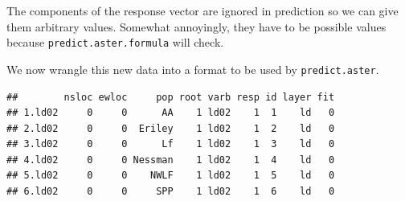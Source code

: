 \documentclass[
  ignorenonframetext,
]{beamer}
\newenvironment{Shaded}{\begin{snugshade}}{\end{snugshade}}
\newcommand{\AttributeTok}[1]{\textcolor[rgb]{0.13,0.29,0.53}{#1}}
\newcommand{\FunctionTok}[1]{\textcolor[rgb]{0.13,0.29,0.53}{\textbf{#1}}}
\newcommand{\NormalTok}[1]{#1}
\newcommand{\OtherTok}[1]{\textcolor[rgb]{0.56,0.35,0.01}{#1}}
\newcommand{\SpecialCharTok}[1]{\textcolor[rgb]{0.81,0.36,0.00}{\textbf{#1}}}
\newcommand{\StringTok}[1]{\textcolor[rgb]{0.31,0.60,0.02}{#1}}
\begin{document}
\begin{frame}[fragile]{}
\protect\hypertarget{section-31}{}
The components of the response vector are ignored in prediction so we
can give them arbitrary values. Somewhat annoyingly, they have to be
possible values because \texttt{predict.aster.formula} will check.

We now wrangle this new data into a format to be used by
\texttt{predict.aster}.

\tiny
\vspace{12pt}

\begin{Shaded}
\end{Shaded}

\begin{verbatim}
##        nsloc ewloc     pop root varb resp id layer fit
## 1.ld02     0     0      AA    1 ld02    1  1    ld   0
## 2.ld02     0     0  Eriley    1 ld02    1  2    ld   0
## 3.ld02     0     0      Lf    1 ld02    1  3    ld   0
## 4.ld02     0     0 Nessman    1 ld02    1  4    ld   0
## 5.ld02     0     0    NWLF    1 ld02    1  5    ld   0
## 6.ld02     0     0     SPP    1 ld02    1  6    ld   0
\end{verbatim}
\end{frame}
\end{document}
